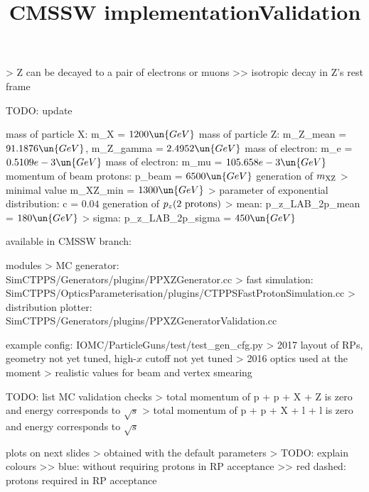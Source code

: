 \>> Z can be decayed to a pair of electrons or muons
\>>> isotropic decay in Z's rest frame


\newpage %

\> TODO: update

\> mass of particle X: m\_X = $1200\un{GeV}$
\> mass of particle Z: m\_Z\_mean = $91.1876\un{GeV}$, m\_Z\_gamma = $2.4952\un{GeV}$
\> mass of electron: m\_e = $0.5109e-3\un{GeV}$
\> mass of electron: m\_mu = $105.658e-3\un{GeV}$
\> momentum of beam protons: p\_beam = $6500\un{GeV}$
\> generation of $m_{\rm XZ}$
\>> minimal value m\_XZ\_min = $1300\un{GeV}$
\>> parameter of exponential distribution: c = $0.04$
\> generation of $p_z(\hbox{2 protons})$
\>> mean: p\_z\_LAB\_2p\_mean = $180\un{GeV}$
\>> sigma: p\_z\_LAB\_2p\_sigma = $450\un{GeV}$


\newpage %
\title{CMSSW implementation}


\> available in CMSSW branch:\\ 

\NormalFonts

\> modules
\>> MC generator:\\ SimCTPPS/Generators/plugins/PPXZGenerator.cc
\>> fast simulation:\\ SimCTPPS/OpticsParameterisation/plugins/CTPPSFastProtonSimulation.cc
\>> distribution plotter:\\ SimCTPPS/Generators/plugins/PPXZGeneratorValidation.cc

\> example config: IOMC/ParticleGuns/test/test\_gen\_cfg.py
\>> 2017 layout of RPs, geometry not yet tuned, high-$x$ cutoff not yet tuned
\>> 2016 optics used at the moment
\>> realistic values for beam and vertex smearing


\newpage %
\title{Validation}

\> TODO: list MC validation checks
\>> total momentum of p + p + X + Z is zero and energy corresponds to $\sqrt s$
\>> total momentum of p + p + X + l + l is zero and energy corresponds to $\sqrt s$

\> plots on next slides
\>> obtained with the default parameters
\>> TODO: explain colours
\>>> blue: without requiring protons in RP acceptance
\>>> red dashed: protons required in RP acceptance


